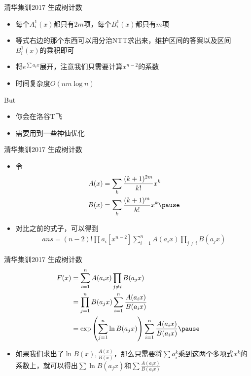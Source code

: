 \documentclass{beamer}
\begin{document}
\begin{frame}{清华集训2017 生成树计数}
    \begin{itemize}
        \item 每个$A^1_i(x)$都只有$2m$项，每个$B^1_i(x)$都只有$m$项 \pause
        \item 等式右边的那个东西可以用分治NTT求出来，维护区间的答案以及区间$B^1_i(x)$的乘积即可 \pause
        \item 将$e^{\sum a_ix}$展开，注意我们只需要计算$x^{n - 2}$的系数 \pause
        \item 时间复杂度$O(nm\log n)$
    \end{itemize}
\end{frame}

\begin{frame}{But}
    \begin{itemize}
        \item 你会在洛谷T飞 \pause
        \item 需要用到一些神仙优化
    \end{itemize}
\end{frame}

\begin{frame}{清华集训2017 生成树计数}
    \begin{itemize}
        \item 令
        $$\begin{aligned}
            A(x) &= \sum_{k} \frac{(k + 1)^{2m}}{k!} x^k\\
            B(x) &= \sum_{k} \frac{(k + 1)^{m}}{k!} x^k \pause
        \end{aligned}$$
        \item 对比之前的式子，可以得到
        $$\begin{aligned}
            ans = (n - 2)!\prod a_i [x^{n - 2}] \sum_{i = 1}^n A(a_ix) \prod_{j\neq i} B(a_jx)
        \end{aligned}$$
    \end{itemize}
\end{frame}

\begin{frame}{清华集训2017 生成树计数}
    $$\begin{aligned}
        F(x) &= \sum_{i = 1}^n A(a_ix) \prod_{j\neq i} B(a_jx)\\
        &= \prod_{j = 1}^n B(a_jx) \sum_{i = 1}^n \frac{A(a_ix)}{B(a_ix)}\\
        &= \exp \left(\sum_{j = 1}^n \ln B(a_jx)\right) \sum_{i = 1}^n \frac{A(a_ix)}{B(a_ix)} \pause
    \end{aligned}$$
    \begin{itemize}
        \item 如果我们求出了$\ln B(x), \frac{A(x)}{B(x)}$，那么只需要将$\sum a_i^k$乘到这两个多项式$x^k$的系数上，就可以得出$\sum \ln B(a_jx)$和$\sum \frac{A(a_ix)}{B(a_ix)}$
    \end{itemize}
\end{frame}
\end{document}
